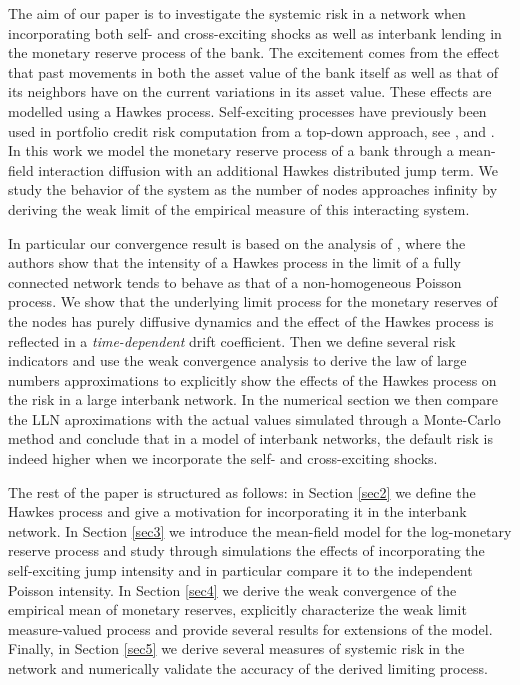 \documentclass[10pt]{article}
\theoremstyle{plain}
\theoremstyle{definition}
\newcommand{\<}{\langle}
\renewcommand{\>}{\rangle}
\renewcommand{\(}{\left(}
\renewcommand{\)}{\right)}
\renewcommand{\[}{\left[}
\renewcommand{\]}{\right]}
\begin{document}
The aim of our paper is to investigate the systemic risk in a network when incorporating both self- and cross-exciting shocks as well as interbank lending in the monetary reserve process of the bank. The excitement comes from the effect that past movements in both the asset value of the bank itself as well as that of its neighbors have on the current variations in its asset value. These effects are modelled using a Hawkes process. Self-exciting processes have previously been used in portfolio credit risk computation from a top-down approach, see \citet{ait15}, \citet{errais10} and \citet{cvitanic12}. In this work we model the monetary reserve process of a bank through a mean-field interaction diffusion with an additional Hawkes distributed jump term. We study the behavior of the system as the number of nodes approaches infinity by deriving the weak limit of the empirical measure of this interacting system. %

In particular our convergence result is based on the analysis of \citet{delattre16}, where the authors show that the intensity of a Hawkes process in the limit of a fully connected network tends to behave as that of a non-homogeneous Poisson process. We show that the underlying limit process for the monetary reserves of the nodes has purely diffusive dynamics and the effect of the Hawkes process is reflected in a \emph{time-dependent} drift coefficient. Then we define several risk indicators and use the weak convergence analysis to derive the law of large numbers approximations to explicitly show the effects of the Hawkes process on the risk in a large interbank network. In the numerical section we then compare the LLN aproximations with the actual values simulated through a Monte-Carlo method and conclude that in a model of interbank networks, the default risk is indeed higher when we incorporate the self- and cross-exciting shocks.

The rest of the paper is structured as follows: in Section \ref{sec2} we define the Hawkes process and give a motivation for incorporating it in the interbank network. In Section \ref{sec3} we introduce the mean-field model for the log-monetary reserve process and study through simulations the effects of incorporating the self-exciting jump intensity and in particular compare it to the independent Poisson intensity. In Section \ref{sec4} we derive the weak convergence of the empirical mean of monetary reserves, explicitly characterize the weak limit measure-valued process and provide several results for extensions of the model. Finally, in Section \ref{sec5} we derive several measures of systemic risk in the network and numerically validate the accuracy of the derived limiting process.
\end{document}
